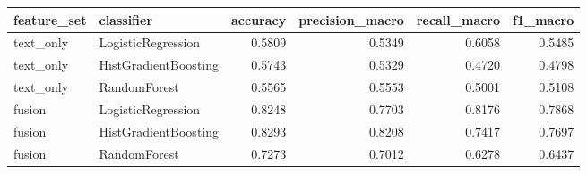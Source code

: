 \begin{tabular}{llrrrr}
\toprule
feature\_set & classifier & accuracy & precision\_macro & recall\_macro & f1\_macro \\
\midrule
text\_only & LogisticRegression & 0.5809 & 0.5349 & 0.6058 & 0.5485 \\
text\_only & HistGradientBoosting & 0.5743 & 0.5329 & 0.4720 & 0.4798 \\
text\_only & RandomForest & 0.5565 & 0.5553 & 0.5001 & 0.5108 \\
fusion & LogisticRegression & 0.8248 & 0.7703 & 0.8176 & 0.7868 \\
fusion & HistGradientBoosting & 0.8293 & 0.8208 & 0.7417 & 0.7697 \\
fusion & RandomForest & 0.7273 & 0.7012 & 0.6278 & 0.6437 \\
\bottomrule
\end{tabular}

